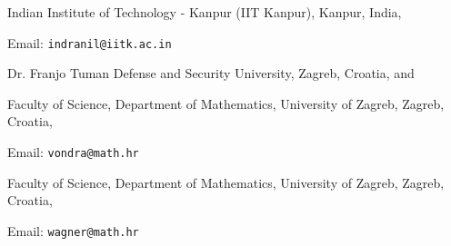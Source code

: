 \documentclass[a4paper,12pt,draft]{article}
\theoremstyle{plain}
\theoremstyle{definition}
\numberwithin{equation}{section}
\newcommand{\1}{1}
\begin{document}
	\bigskip
	
	
	\noindent Indian Institute of Technology - Kanpur (IIT Kanpur), Kanpur, India,
	
	\noindent Email: \texttt{indranil@iitk.ac.in}
    
	 
    \bigskip
    

  \noindent Dr. Franjo Tu\dj man Defense and Security University, Zagreb, Croatia, and
  
  
  \noindent Faculty of Science, Department of Mathematics, University of Zagreb, Zagreb, Croatia,

  \noindent Email: \texttt{vondra@math.hr}

  
	\bigskip
	
	
	\noindent Faculty of Science, Department of Mathematics, University of Zagreb, Zagreb, Croatia,
	
	\noindent Email: \texttt{wagner@math.hr}%
\end{document}
